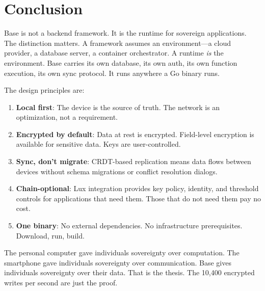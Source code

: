 \section{Conclusion}

\label{sec:conclusion}

Base is not a backend framework. It is the runtime for sovereign applications.
The distinction matters. A framework assumes an environment---a cloud provider,
a database server, a container orchestrator. A runtime \emph{is} the
environment. Base carries its own database, its own auth, its own function
execution, its own sync protocol. It runs anywhere a Go binary runs.

The design principles are:

\begin{enumerate}[leftmargin=1.4em]
    \item \textbf{Local first}: The device is the source of truth. The network
    is an optimization, not a requirement.
    \item \textbf{Encrypted by default}: Data at rest is encrypted. Field-level
    encryption is available for sensitive data. Keys are user-controlled.
    \item \textbf{Sync, don't migrate}: CRDT-based replication means data flows
    between devices without schema migrations or conflict resolution dialogs.
    \item \textbf{Chain-optional}: Lux integration provides key policy,
    identity, and threshold controls for applications that need them. Those
    that do not need them pay no cost.
    \item \textbf{One binary}: No external dependencies. No infrastructure
    prerequisites. Download, run, build.
\end{enumerate}

The personal computer gave individuals sovereignty over computation. The
smartphone gave individuals sovereignty over communication. Base gives
individuals sovereignty over their data. That is the thesis. The 10,400
encrypted writes per second are just the proof.

